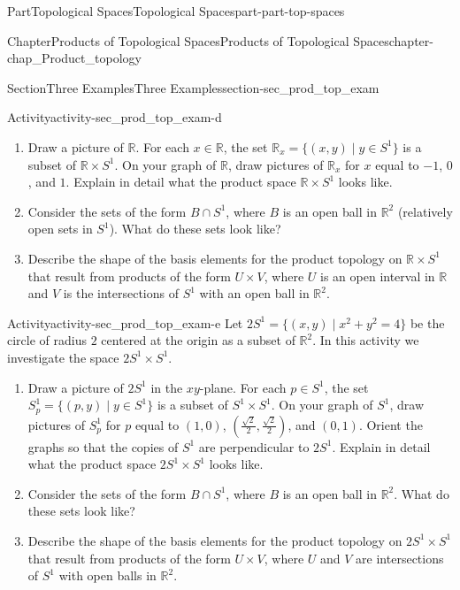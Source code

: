 \documentclass[oneside,10pt,]{book}
\numberwithin{equation}{chapter}
\newcommand{\R}{\mathbb{R}}
\begin{document}
\begin{partptx}{Part}{Topological Spaces}{}{Topological Spaces}{}{}{part-part-top-spaces}
\begin{chapterptx}{Chapter}{Products of Topological Spaces}{}{Products of Topological Spaces}{}{}{chapter-chap_Product_topology}
\begin{sectionptx}{Section}{Three Examples}{}{Three Examples}{}{}{section-sec_prod_top_exam}
\begin{activity}{Activity}{}{activity-sec_prod_top_exam-d}
\begin{enumerate}[font=\bfseries,label=(\alph*),ref=\alph*]
\item{}Draw a picture of \(\R\). For each \(x \in \R\), the set \(\R_x = \{(x, y) \mid y \in S^1\}\) is a subset of \(\R \times S^1\). On your graph of \(\R\), draw pictures of \(\R_x\) for \(x\) equal to \(-1\), \(0\), and \(1\). Explain in detail what the product space \(\R \times S^1\) looks like.%
\item{}Consider the sets of the form \(B \cap S^1\), where \(B\) is an open ball in \(\R^2\) (relatively open sets in \(S^1\)). What do these sets look like?%
\item{}Describe the shape of the basis elements for the product topology on \(\R \times S^1\) that result from products of the form \(U \times V\), where \(U\) is an open interval in \(\R\) and \(V\) is the intersections of \(S^1\) with an open ball in \(\R^2\).%
\end{enumerate}%
\end{activity}%
\begin{activity}{Activity}{}{activity-sec_prod_top_exam-e}%
Let \(2S^1 = \{(x,y) \mid x^2 + y^2 = 4\}\) be the circle of radius \(2\) centered at the origin as a subset of \(\R^2\). In this activity we investigate the space \(2S^1 \times S^1\).%
\begin{enumerate}[font=\bfseries,label=(\alph*),ref=\alph*]%
\item{}Draw a picture of \(2S^1\) in the \(xy\)-plane. For each \(p \in S^1\), the set \(S^1_p = \{(p, y) \mid y \in S^1\}\) is a subset of \(S^1 \times S^1\). On your graph of \(S^1\), draw pictures of \(S^1_p\) for \(p\) equal to \((1,0)\), \(\left(\frac{\sqrt{2}}{2}, \frac{\sqrt{2}}{2}\right)\), and \((0,1)\). Orient the graphs so that the copies of \(S^1\) are perpendicular to \(2S^1\). Explain in detail what the product space \(2S^1 \times S^1\) looks like.%
\item{}Consider the sets of the form \(B \cap S^1\), where \(B\) is an open ball in \(\R^2\). What do these sets look like?%
\item{}Describe the shape of the basis elements for the product topology on \(2S^1 \times S^1\) that result from products of the form \(U \times V\), where \(U\) and \(V\) are intersections of \(S^1\) with open balls in \(\R^2\).%
\end{enumerate}%
\end{activity}%
\end{sectionptx}
%
%
\typeout{************************************************}
\typeout{************************************************}

\end{chapterptx}
\end{partptx}
\end{document}
